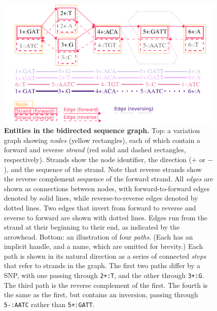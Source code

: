 \documentclass{article}
\begin{document}


\FloatBarrier

\begin{figure}
	\begin{center}
		\includegraphics[width=1.0\textwidth]{figures/GRaphchrXpaper.pdf}
	\end{center}
	\caption{{\label{fig:graph}
        \textbf{Entities in the bidirected sequence graph.}
        Top: a variation graph showing \emph{nodes} (yellow rectangles), each of which contain a forward and reverse \emph{strand} (red solid and dashed rectangles, respectively).
        Strands show the node identifier, the direction ($+$ or $-$), and the sequence of the strand.
        Note that reverse strands show the reverse complement sequence of the forward strand.
        All \emph{edges} are shown as connections between nodes, with forward-to-forward edges denoted by solid lines, while reverse-to-reverse edges denoted by dotted lines.
        Two edges that invert from forward to reverse and reverse to forward are shown with dotted lines.
        Edges run from the strand at their beginning to their end, as indicated by the arrowhead.
        Bottom: an illustration of four \emph{paths}.
        (Each has an implicit handle, and a name, which are omitted for brevity.)
        Each path is shown in its natural direction as a series of connected \emph{steps} that refer to strands in the graph.
        The first two paths differ by a SNP, with one passing through \texttt{2+:T}, and the other through \texttt{3+:G}.
        The third path is the reverse complement of the first.
        The fourth is the same as the first, but contains an inversion, passing through \texttt{5-:AATC} rather than \texttt{5+:GATT}.
      }
    }
\end{figure}
\end{document}
